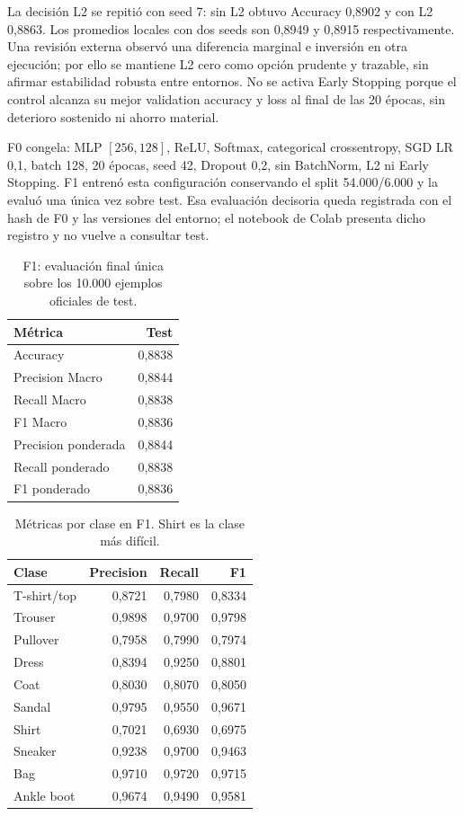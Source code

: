 \documentclass[10pt,a4paper]{article}
\begin{document}
La decisión L2 se repitió con seed 7: sin L2 obtuvo Accuracy 0,8902 y con L2 0,8863. Los promedios locales con dos seeds son 0,8949 y 0,8915 respectivamente. Una revisión externa observó una diferencia marginal e inversión en otra ejecución; por ello se mantiene L2 cero como opción prudente y trazable, sin afirmar estabilidad robusta entre entornos. No se activa Early Stopping porque el control alcanza su mejor validation accuracy y loss al final de las 20 épocas, sin deterioro sostenido ni ahorro material.

F0 congela: MLP $[256,128]$, ReLU, Softmax, categorical crossentropy, SGD LR 0,1, batch 128, 20 épocas, seed 42, Dropout 0,2, sin BatchNorm, L2 ni Early Stopping. F1 entrenó esta configuración conservando el split 54.000/6.000 y la evaluó una única vez sobre test. Esa evaluación decisoria queda registrada con el hash de F0 y las versiones del entorno; el notebook de Colab presenta dicho registro y no vuelve a consultar test.

\begin{table}[H]
\centering
\begin{tabular}{lr}
\toprule Métrica & Test \\
\midrule
Accuracy & 0,8838 \\
Precision Macro & 0,8844 \\
Recall Macro & 0,8838 \\
F1 Macro & 0,8836 \\
Precision ponderada & 0,8844 \\
Recall ponderado & 0,8838 \\
F1 ponderado & 0,8836 \\
\bottomrule
\end{tabular}
\caption{F1: evaluación final única sobre los 10.000 ejemplos oficiales de test.}
\end{table}

\begin{table}[H]
\centering\small
\begin{tabular}{lrrr}
\toprule Clase & Precision & Recall & F1 \\
\midrule
T-shirt/top & 0,8721 & 0,7980 & 0,8334 \\
Trouser & 0,9898 & 0,9700 & 0,9798 \\
Pullover & 0,7958 & 0,7990 & 0,7974 \\
Dress & 0,8394 & 0,9250 & 0,8801 \\
Coat & 0,8030 & 0,8070 & 0,8050 \\
Sandal & 0,9795 & 0,9550 & 0,9671 \\
Shirt & 0,7021 & 0,6930 & 0,6975 \\
Sneaker & 0,9238 & 0,9700 & 0,9463 \\
Bag & 0,9710 & 0,9720 & 0,9715 \\
Ankle boot & 0,9674 & 0,9490 & 0,9581 \\
\bottomrule
\end{tabular}
\caption{Métricas por clase en F1. Shirt es la clase más difícil.}
\end{table}
\end{document}
